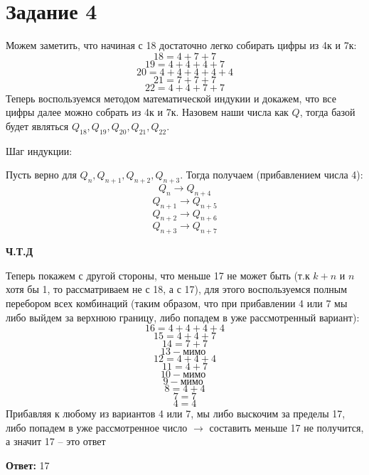 \documentclass[a4paper,12pt]{article}
\author{Бурмашев Григорий, БПМИ-208}
\title{}
\date{\today}
\begin{document}
\section*{Задание 4}
Можем заметить, что начиная с 18 достаточно легко собирать цифры из 4к и 7к:
\[
18 = 4 + 7 + 7
\]
\[
19 = 4 + 4 + 4 + 7
\]
\[
20 = 4 + 4 +4 +4 +4 
\]
\[
21 = 7 + 7 + 7
\]
\[
22 = 4 + 4 + 7 + 7 
\]
Теперь воспользуемся методом математической индукии и докажем, что все цифры далее можно собрать из 4к и 7к. Назовем наши числа как $Q$, тогда базой будет являться $Q_{18}, Q_{19}, Q_{20}, Q_{21}, Q_{22}$.

Шаг индукции:

Пусть верно для $Q_n, Q_{n + 1}, Q_{n + 2}, Q_{n + 3}$. Тогда получаем (прибавлением числа 4):
\[
Q_n \rightarrow Q_{n + 4}
\]
\[
Q_{n + 1} \rightarrow Q_{n + 5}
\]
\[
Q_{n + 2} \rightarrow Q_{n + 6}
\]
\[
Q_{n + 3} \rightarrow Q_{n + 7}
\]
\begin{center}
\textbf{Ч.Т.Д} 
\end{center}
Теперь покажем с другой стороны, что меньше 17 не может быть (т.к $k + n$  и $n$ хотя бы 1, то рассматриваем не с 18, а с 17), для этого воспользуемся полным перебором всех комбинаций (таким образом, что при прибавлении 4 или 7 мы либо выйдем за верхнюю границу, либо попадем в уже рассмотренный вариант):
\[
16 = 4 + 4 +4 +4 
\]
\[
15 = 4 + 4 + 7
\]
\[
14 = 7 + 7
\]
\[
13 - \text{мимо }
\]
\[
12 = 4 + 4 + 4
\]
\[
11 = 4 + 7
\]
\[
10 - \text{мимо }
\]
\[
9 - \text{мимо }
\]
\[
8 = 4 + 4
\]
\[
7 = 7
\]
\[
4 = 4
\]
Прибавляя к любому из вариантов 4 или 7, мы либо выскочим за пределы 17, либо попадем в уже рассмотренное число $\rightarrow$ составить меньше 17 не получится, а значит 17 -- это ответ
\begin{center}
\textbf{Ответ: } 17
\end{center}
\end{document}

